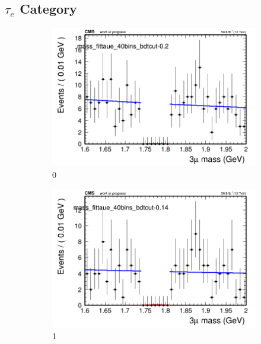 \newpage

\subsection{$\tau_{e}$ Category}
\label{sec:taue}

\begin{figure}[h!]
    \centering
    \begin{subfigure}{0.2\textwidth}
        \includegraphics[width=\textwidth]{power_law/plots/taue/massfit_taue_40bins_bdtcut-0.2.png}
        \caption{0}
    \end{subfigure}
    \begin{subfigure}{0.2\textwidth}
        \includegraphics[width=\textwidth]{power_law/plots/taue/massfit_taue_40bins_bdtcut-0.14.png}
        \caption{1}
    \end{subfigure}
    \begin{subfigure}{0.2\textwidth}

\end{subfigure}
\end{figure}
